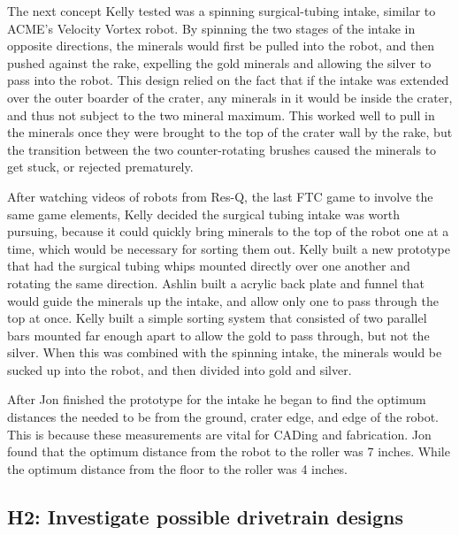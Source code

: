 \documentclass{article}
\begin{document}
The next concept Kelly tested was a spinning surgical-tubing intake, similar to ACME's Velocity Vortex robot. By spinning the two stages of the intake in opposite directions, the minerals would first be pulled into the robot, and then pushed against the rake, expelling the gold minerals and allowing the silver to pass into the robot. This design relied on the fact that if the intake was extended over the outer boarder of the crater, any minerals in it would be inside the crater, and thus not subject to the two mineral maximum. This worked well to pull in the minerals once they were brought to the top of the crater wall by the rake, but the transition between the two counter-rotating brushes caused the minerals to get stuck, or rejected prematurely. 

After watching videos of robots from Res-Q, the last FTC game to involve the same game elements, Kelly decided the surgical tubing intake was worth pursuing, because it could quickly bring minerals to the top of the robot one at a time, which would be necessary for sorting them out. Kelly built a new prototype that had the surgical tubing whips mounted directly over one another and rotating the same direction. Ashlin built a acrylic back plate and funnel that would guide the minerals up the intake, and allow only one to pass through the top at once. Kelly built a simple sorting system that consisted of two parallel bars mounted far enough apart to allow the gold to pass through, but not the silver. When this was combined with the spinning intake, the minerals would be sucked up into the robot, and then divided into gold and silver. 

After Jon finished the prototype for the intake he began to find the optimum distances the needed to be from the ground, crater edge, and edge of the robot. This is because these measurements are vital for CADing and fabrication. Jon found that the optimum distance from the robot to the roller was 7 inches. While the optimum distance from the floor to the roller was 4 inches. 

\subsection{H2: Investigate possible drivetrain designs}
\end{document}
